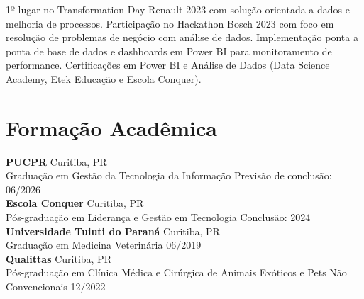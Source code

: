 \documentclass[11pt,a4paper]{article}
\begin{document}
1º lugar no Transformation Day Renault 2023 com solução orientada a dados e melhoria de processos. Participação no Hackathon Bosch 2023 com foco em resolução de problemas de negócio com análise de dados. Implementação ponta a ponta de base de dados e dashboards em Power BI para monitoramento de performance. Certificações em Power BI e Análise de Dados (Data Science Academy, Etek Educação e Escola Conquer).

\section{Formação Acadêmica}

\textbf{PUCPR} \hfill Curitiba, PR\\
Graduação em Gestão da Tecnologia da Informação \hfill Previsão de conclusão: 06/2026\\[6pt]

\textbf{Escola Conquer} \hfill Curitiba, PR\\
Pós-graduação em Liderança e Gestão em Tecnologia \hfill Conclusão: 2024\\[6pt]

\textbf{Universidade Tuiuti do Paraná} \hfill Curitiba, PR\\
Graduação em Medicina Veterinária \hfill 06/2019\\[6pt]

\textbf{Qualittas} \hfill Curitiba, PR\\
Pós-graduação em Clínica Médica e Cirúrgica de Animais Exóticos e Pets Não Convencionais \hfill 12/2022
\end{document}
